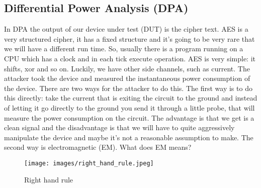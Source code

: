 \subsection{Differential Power Analysis (DPA)}\label{c8_prev_lectures_recap_dpa_sc:subsec}
In DPA the output of our device under test (DUT) is the cipher text. AES is a very structured cipher, it has a fixed structure and it’s going to be very rare that we will have a different run time. So, usually there is a program running on a CPU which has a clock and in each tick execute operation. AES is very simple: it shifts, xor and so on. Luckily, we have other side channels, such as current. The attacker took the device and measured the instantaneous power consumption of the device. There are two ways for the attacker to do this. The first way is to do this directly: take the current that is exiting the circuit to the ground and instead of letting it go directly to the ground you send it through a little probe, that will measure the power consumption on the circuit. The advantage is that we get is a clean signal and the disadvantage is that we will have to quite aggressively manipulate the device and maybe it’s not a reasonable assumption to make. The second way is electromagnetic (EM). What does EM means? 
\begin{figure}[H]
    \centering
    \texttt{[image: images/right\_hand\_rule.jpeg]}
    \caption{Right hand rule} \label{c8_right_hand_rule:fig}
\end{figure}
